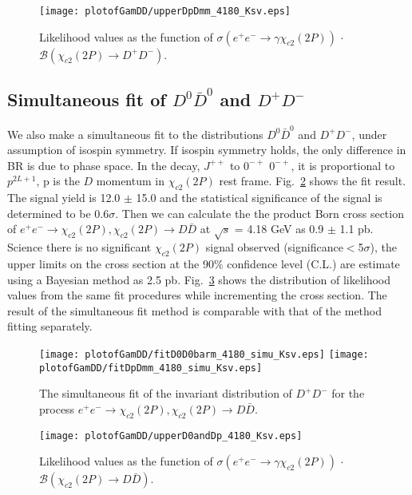 \documentclass[aps,preprint,tightenlines,superscriptaddress,showpacs,byrevtex,amsmath,amssymb,nofloatfix]{revtex4}
\begin{document}
\begin{figure}[!htbp]
\captionsetup{justification=raggedright}
    \texttt{[image: plotofGamDD/upperDpDmm\_4180\_Ksv.eps]}

  \caption{\small Likelihood values as the function of $\sigma (e^{+}e^{-}\rightarrow \gamma \chi_{c2} (2P))$ $\cdot$ $\mathcal{B}(\chi_{c2} (2P)\rightarrow  D^{+}D^{-})$.}
  \label{FitDDbar_Dp_up}
\end{figure}


\subsection{Simultaneous fit of $D^{0}\bar{D}^{0}$ and $D^{+}D^{-}$}

We also  make a simultaneous fit to the distributions $D^{0}\bar{D}^{0}$ and $D^{+}D^{-}$, under assumption of isospin symmetry. If isospin symmetry holds, the only difference in BR is due to phase space. In the decay, $J^{++}$ to $0^{-+}$ $0^{-+}$, it is proportional to $p^{2L+1}$, p is the $D$ momentum in $\chi_{c2} (2P)$ rest frame. Fig.~\ref{fitmDDbar_simu_4180} shows the fit result. The signal yield is 12.0 $\pm$ 15.0 and the statistical significance of the signal is determined to be 0.6$\sigma$. Then we can calculate the the product Born cross section of $e^{+}e^{-} \rightarrow \chi_{c2}(2P), \chi_{c2}(2P) \rightarrow D\bar{D}$ at $\sqrt{s}$ = 4.18 GeV as 0.9 $\pm$ 1.1 pb. Science there is no significant $\chi_{c2}(2P)$ signal observed (significance$<$5$\sigma$), the upper limits on the cross section at the $90\%$ confidence level (C.L.) are estimate using a Bayesian method as 2.5 pb. Fig.~\ref{FitDDbar_simu_up} shows the distribution of likelihood values from the same fit procedures while incrementing the cross section. The result of the simultaneous fit method is comparable with that of the method fitting separately.

\begin{figure}[!htbp]
  \captionsetup{justification=raggedright}
  \texttt{[image: plotofGamDD/fitD0D0barm\_4180\_simu\_Ksv.eps]}
  \texttt{[image: plotofGamDD/fitDpDmm\_4180\_simu\_Ksv.eps]}
  \caption{\small The simultaneous fit of the invariant distribution of $D^{+}D^{-}$ for the process $e^{+}e^{-} \rightarrow \chi_{c2}(2P), \chi_{c2}(2P) \rightarrow D\bar{D}$.}
  \label{fitmDDbar_simu_4180}
\end{figure}

\begin{figure}[!htbp]
\captionsetup{justification=raggedright}
    \texttt{[image: plotofGamDD/upperD0andDp\_4180\_Ksv.eps]}

  \caption{\small Likelihood values as the function of $\sigma (e^{+}e^{-}\rightarrow \gamma \chi_{c2} (2P))$ $\cdot$ $\mathcal{B}(\chi_{c2} (2P)\rightarrow  D\bar{D})$.}
  \label{FitDDbar_simu_up}
\end{figure}
\end{document}
